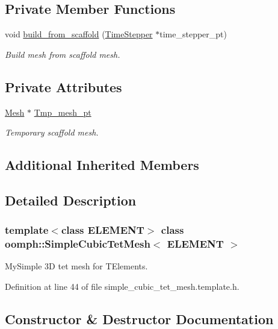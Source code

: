 \subsection*{Private Member Functions}
\begin{DoxyCompactItemize}
\item 
void \hyperlink{classoomph_1_1SimpleCubicTetMesh_a558c1fcc4bd91cdb2830977df2171537}{build\+\_\+from\+\_\+scaffold} (\hyperlink{classoomph_1_1TimeStepper}{Time\+Stepper} $\ast$time\+\_\+stepper\+\_\+pt)
\begin{DoxyCompactList}\small\item\em Build mesh from scaffold mesh. \end{DoxyCompactList}\end{DoxyCompactItemize}
\subsection*{Private Attributes}
\begin{DoxyCompactItemize}
\item 
\hyperlink{classoomph_1_1Mesh}{Mesh} $\ast$ \hyperlink{classoomph_1_1SimpleCubicTetMesh_a125fc9ec4d3d74e147ac7f17f867e1a3}{Tmp\+\_\+mesh\+\_\+pt}
\begin{DoxyCompactList}\small\item\em Temporary scaffold mesh. \end{DoxyCompactList}\end{DoxyCompactItemize}
\subsection*{Additional Inherited Members}


\subsection{Detailed Description}
\subsubsection*{template$<$class E\+L\+E\+M\+E\+NT$>$\newline
class oomph\+::\+Simple\+Cubic\+Tet\+Mesh$<$ E\+L\+E\+M\+E\+N\+T $>$}

My\+Simple 3D tet mesh for T\+Elements. 

Definition at line 44 of file simple\+\_\+cubic\+\_\+tet\+\_\+mesh.\+template.\+h.



\subsection{Constructor \& Destructor Documentation}
\mbox{\label{classoomph_1_1SimpleCubicTetMesh_a636c5d124ede05ff29abdcf7fdd08391}} 

